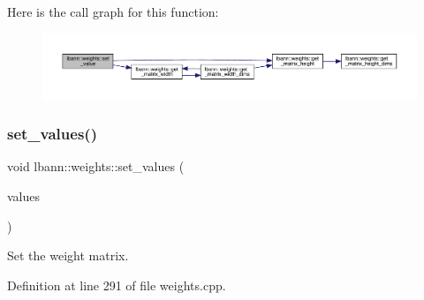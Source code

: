 Here is the call graph for this function\+:\nopagebreak
\begin{figure}[H]
\begin{center}
\leavevmode
\includegraphics[width=350pt]{classlbann_1_1weights_a7ac0a9e53b249f16d5e2978e47bd6b7f_cgraph}
\end{center}
\end{figure}
\mbox{\label{classlbann_1_1weights_ae10da5d92c9402ced7e55f04fbd05a2e}} 
\subsubsection{\texorpdfstring{set\+\_\+values()}{set\_values()}}
{\footnotesize\ttfamily void lbann\+::weights\+::set\+\_\+values (\begin{DoxyParamCaption}\item[{const \hyperlink{base_8hpp_a9a697a504ae84010e7439ffec862b470}{Abs\+Dist\+Mat} \&}]{values }\end{DoxyParamCaption})}

Set the weight matrix. 

Definition at line 291 of file weights.\+cpp.


